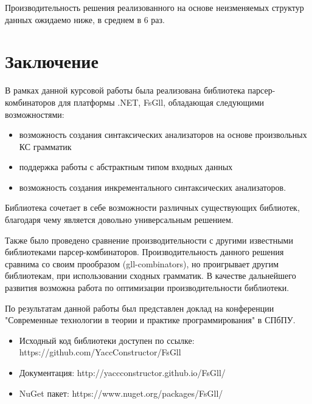 \documentclass[14pt]{matmex-diploma}
\begin{document}
Производительность решения реализованного на основе неизменяемых структур данных ожидаемо ниже, 
в среднем в 6 раз.



\section*{Заключение}
В рамках данной курсовой работы была реализована библиотека парсер-комбинаторов 
для платформы .NET, FsGll, обладающая следующими возможностями:
\begin{itemize}
    \item возможность создания синтаксических анализаторов на основе произвольных КС грамматик
    \item поддержка работы с абстрактным типом входных данных 
    \item возможность создания инкрементального синтаксических анализаторов.
\end{itemize}

Библиотека сочетает в себе возможности различных существующих библиотек, 
благодаря чему является довольно универсальным решением. 

Также было проведено сравнение производительности с другими известными библиотеками парсер-комбинаторов.
Производительность данного решения сравнима со своим прообразом (gll-combinators), 
но проигрывает другим библиотекам, при использовании сходных грамматик. В качестве дальнейшего развития возможна работа по оптимизации производительности библиотеки. 

По результатам данной работы был представлен доклад на конференции 
"Современные технологии в теории и практике программирования" в СПбПУ.

\begin{itemize}
    \item Исходный код библиотеки доступен по ссылке: https://github.com/YaccConstructor/FsGll
    \item Документация: http://yaccconstructor.github.io/FsGll/
    \item NuGet пакет: https://www.nuget.org/packages/FsGll/
\end{itemize}


\setmonofont[Mapping=tex-text]{CMU Typewriter Text}


\end{document}
